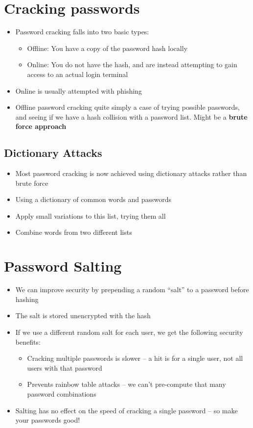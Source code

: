 \documentclass{article}
\begin{document}
\section{Cracking passwords}
\begin{itemize}
  \item Password cracking falls into two basic types: 
    \begin{itemize}
      \item Offline: You have a copy of the password hash locally 
      \item Online: You do not have the hash, and are instead attempting to gain access to an actual login terminal 
    \end{itemize}
  \item Online is usually attempted with phishing
  \item Offline password cracking quite simply a case of trying possible passwords, and seeing if we have a hash collision with a password list. Might be a \textbf{brute force approach}
\end{itemize}

\subsection{Dictionary Attacks}
\begin{itemize}
  \item Most password cracking is now achieved using dictionary attacks rather than brute force 
  \item Using a dictionary of common words and passwords 
  \item Apply small variations to this list, trying them all 
  \item Combine words from two different lists
\end{itemize}

\section{Password Salting}
\begin{itemize}
  \item We can improve security by prepending a random “salt” to a password before hashing 
  \item The salt is stored unencrypted with the hash
  \item If we use a different random salt for each user, we get the following security benefits:
  \begin{itemize}
    \item Cracking multiple passwords is slower – a hit is for a single user, not all users with that password
    \item Prevents rainbow table attacks – we can’t pre-compute that many password combinations 
  \end{itemize}
  \item Salting has no effect on the speed of cracking a single password – so make your passwords good!
\end{itemize}
\end{document}
